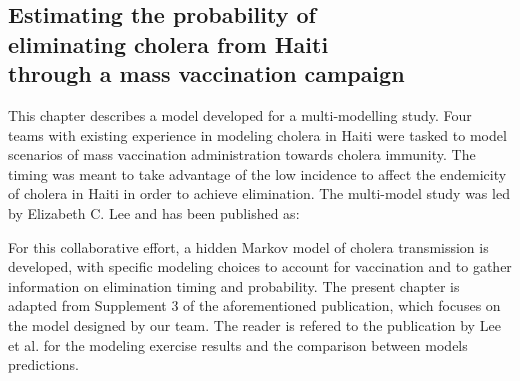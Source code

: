 \begin{fullwidth}
\chapter[Estimating the probability of eliminating cholera from Haiti through a mass vaccination campaign]{Estimating the probability of \\ eliminating cholera from Haiti \\ through a mass vaccination campaign}%

This chapter describes a model developed for a multi-modelling study. Four teams with existing experience in modeling cholera in Haiti were tasked to model scenarios of mass vaccination administration towards cholera immunity. The timing was meant to take advantage of the low incidence to affect the endemicity of cholera in Haiti in order to achieve elimination. The multi-model study was led by Elizabeth C. Lee and has been published as:



For this collaborative effort, a hidden Markov model of cholera transmission is developed, with specific modeling choices to account for vaccination and to gather information on elimination timing and probability.
The present chapter is adapted from Supplement 3 of the aforementioned publication, which focuses on the model designed by our team. The reader is refered to the publication by Lee et al. for the modeling exercise results and the comparison between models predictions.
\label{ch:cholera-haiti-ocv}
\end{fullwidth}


